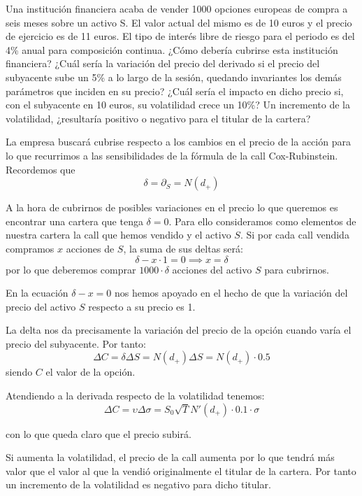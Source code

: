 \begin{problem}[4]
Una institución financiera acaba de vender 1000 opciones europeas de compra a seis meses sobre
un activo S. El valor actual del mismo es de 10 euros y el precio de ejercicio es de 11 euros. El tipo
de interés libre de riesgo para el periodo es del 4\% anual para composición continua.
\ppart ¿Cómo debería cubrirse esta institución financiera?
\ppart ¿Cuál sería la variación del precio del derivado si el precio del subyacente sube un 5\% a lo largo de la sesión, quedando invariantes los demás parámetros que inciden en su precio?
\ppart ¿Cuál sería el impacto en dicho precio si, con el subyacente en 10 euros, su volatilidad crece un 10\%?
\ppart Un incremento de la volatilidad, ¿resultaría positivo o negativo para el titular de la cartera?
\solution
{}

\spart

La empresa buscará cubrise respecto a los cambios en el precio de la acción para lo que recurrimos a las sensibilidades de la fórmula de la call Cox-Rubinstein. Recordemos que
\[δ = \partial_S = N(d_+)\]

A la hora de cubrirnos de posibles variaciones en el precio lo que queremos es encontrar una cartera que tenga $δ=0$. Para ello consideramos como elementos de nuestra cartera la call que hemos vendido y el activo $S$. Si por cada call vendida compramos $x$ acciones de $S$, la suma de sus deltas será:
\[δ - x\cdot 1 = 0 \implies x = δ\]
por lo que deberemos comprar $1000\cdot δ$ acciones del activo $S$ para cubrirnos.

\obs En la ecuación $δ-x=0$ nos hemos apoyado en el hecho de que la variación del precio del activo $S$ respecto a su precio es 1.

\spart

La delta nos da precisamente la variación del precio de la opción cuando varía el precio del subyacente. Por tanto:
\[ΔC = δΔS = N(d_+)ΔS = N(d_+)\cdot 0.5 \]
siendo $C$ el valor de la opción.

\spart

Atendiendo a la derivada respecto de la volatilidad tenemos:
\[ΔC = \upsilon Δσ = S_0\sqrt{T}N'(d_+)\cdot 0.1 \cdot σ\]

con lo que queda claro que el precio subirá.

\spart

Si aumenta la volatilidad, el precio de la call aumenta por lo que tendrá más valor que el valor al que la vendió originalmente el titular de la cartera. Por tanto un incremento de la volatilidad es negativo para dicho titular.

\end{problem}

